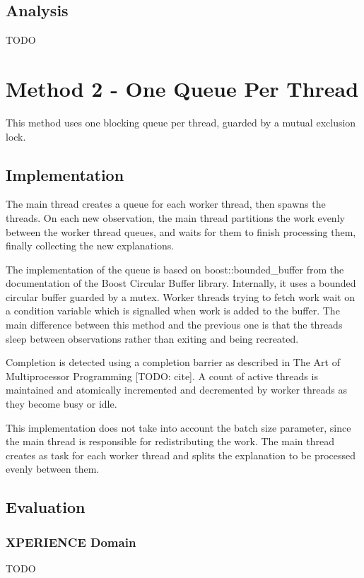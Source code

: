 \documentclass[12pt,twoside,abbrevs,msc,ai,notimes,logo,sansheadings]{infthesis}
\begin{document}
  \section{Analysis}
  TODO
  
  \chapter {Method 2 - One Queue Per Thread}
  
  This method uses one blocking queue per thread, guarded by a mutual exclusion lock.
  
  \section {Implementation}
  
  The main thread creates a queue for each worker thread, then spawns the threads. On each new observation, the main thread partitions the work evenly between the worker thread queues, and waits for them to finish processing them, finally collecting the new explanations.
  
  The implementation of the queue is based on boost::bounded\_buffer from the documentation of the Boost Circular Buffer library. Internally, it uses a bounded circular buffer guarded by a mutex. Worker threads trying to fetch work wait on a condition variable which is signalled when work is added to the buffer. The main difference between this method and the previous one is that the threads sleep between observations rather than exiting and being recreated.
  
  Completion is detected using a completion barrier as described in The Art of Multiprocessor Programming [TODO: cite]. A count of active threads is maintained and atomically incremented and decremented by worker threads as they become busy or idle.
  
  This implementation does not take into account the batch size parameter, since the main thread is responsible for redistributing the work. The main thread creates as task for each worker thread and splits the explanation to be processed evenly between them.
  
  \section{Evaluation}
  \subsection{XPERIENCE Domain}
  TODO
  
\end{document}
